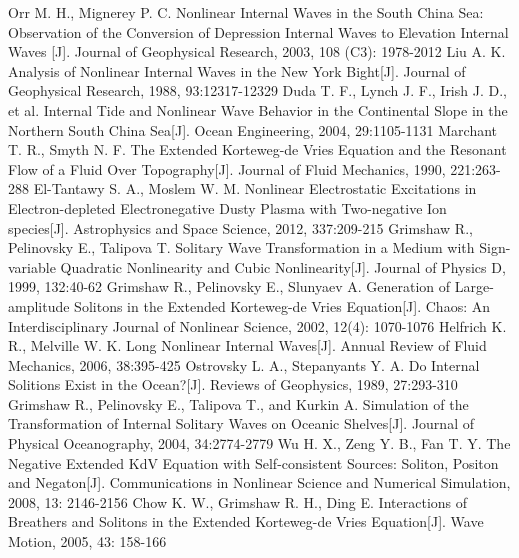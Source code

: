 \begin{thebibliography}{0}
 Orr M. H., Mignerey P. C. Nonlinear Internal Waves in the South China Sea: Observation of the Conversion of Depression Internal Waves to Elevation Internal Waves [J]. Journal of Geophysical Research, 2003, 108 (C3): 1978-2012
 Liu A. K. Analysis of Nonlinear Internal Waves in the New York Bight[J]. Journal of Geophysical Research, 1988, 93:12317-12329
Duda T. F., Lynch J. F., Irish J. D., et al. Internal Tide and Nonlinear Wave Behavior in the Continental Slope in the Northern South China Sea[J]. Ocean Engineering, 2004, 29:1105-1131 %
 Marchant T. R., Smyth N. F. The Extended Korteweg-de Vries Equation and the Resonant Flow of a Fluid Over Topography[J]. Journal of Fluid Mechanics, 1990, 221:263-288%
 El-Tantawy S. A., Moslem W. M. Nonlinear Electrostatic Excitations in Electron-depleted Electronegative Dusty Plasma with Two-negative Ion species[J]. Astrophysics and Space Science, 2012, 337:209-215
 Grimshaw R., Pelinovsky E., Talipova T. Solitary Wave Transformation in a Medium with Sign-variable Quadratic Nonlinearity and Cubic Nonlinearity[J]. Journal of Physics D, 1999, 132:40-62
 Grimshaw R., Pelinovsky E., Slunyaev A. Generation of Large-amplitude Solitons in the Extended Korteweg-de Vries Equation[J]. Chaos: An Interdisciplinary Journal of Nonlinear Science, 2002, 12(4): 1070-1076
 Helfrich K. R., Melville W. K. Long Nonlinear Internal Waves[J]. Annual Review of Fluid Mechanics, 2006, 38:395-425%
 Ostrovsky L. A., Stepanyants Y. A. Do Internal Solitions Exist in the Ocean?[J]. Reviews of Geophysics, 1989, 27:293-310%
 Grimshaw R., Pelinovsky E., Talipova T., and Kurkin A. Simulation of the Transformation of Internal Solitary Waves on Oceanic Shelves[J]. Journal of Physical Oceanography, 2004, 34:2774-2779%
 Wu H. X., Zeng Y. B., Fan T. Y. The Negative Extended KdV Equation with Self-consistent Sources: Soliton, Positon and Negaton[J]. Communications in Nonlinear Science and Numerical Simulation, 2008, 13: 2146-2156
 Chow K. W., Grimshaw R. H., Ding E. Interactions of Breathers and Solitons in the Extended Korteweg-de Vries Equation[J]. Wave Motion, 2005, 43: 158-166%

\end{thebibliography}
